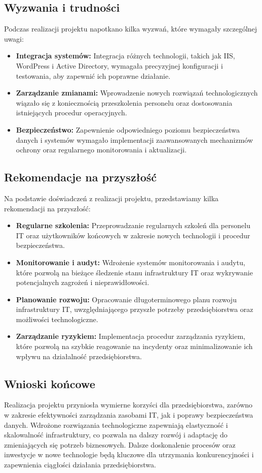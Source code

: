 \subsection{Wyzwania i trudności}
Podczas realizacji projektu napotkano kilka wyzwań, które wymagały szczególnej uwagi:
\begin{itemize}
    \item \textbf{Integracja systemów:} Integracja różnych technologii, takich jak IIS, WordPress i Active Directory, wymagała precyzyjnej konfiguracji i testowania, aby zapewnić ich poprawne działanie.
    \item \textbf{Zarządzanie zmianami:} Wprowadzenie nowych rozwiązań technologicznych wiązało się z koniecznością przeszkolenia personelu oraz dostosowania istniejących procedur operacyjnych.
    \item \textbf{Bezpieczeństwo:} Zapewnienie odpowiedniego poziomu bezpieczeństwa danych i systemów wymagało implementacji zaawansowanych mechanizmów ochrony oraz regularnego monitorowania i aktualizacji.
\end{itemize}

\subsection{Rekomendacje na przyszłość}
Na podstawie doświadczeń z realizacji projektu, przedstawiamy kilka rekomendacji na przyszłość:
\begin{itemize}
    \item \textbf{Regularne szkolenia:} Przeprowadzanie regularnych szkoleń dla personelu IT oraz użytkowników końcowych w zakresie nowych technologii i procedur bezpieczeństwa.
    \item \textbf{Monitorowanie i audyt:} Wdrożenie systemów monitorowania i audytu, które pozwolą na bieżące śledzenie stanu infrastruktury IT oraz wykrywanie potencjalnych zagrożeń i nieprawidłowości.
    \item \textbf{Planowanie rozwoju:} Opracowanie długoterminowego planu rozwoju infrastruktury IT, uwzględniającego przyszłe potrzeby przedsiębiorstwa oraz możliwości technologiczne.
    \item \textbf{Zarządzanie ryzykiem:} Implementacja procedur zarządzania ryzykiem, które pozwolą na szybkie reagowanie na incydenty oraz minimalizowanie ich wpływu na działalność przedsiębiorstwa.
\end{itemize}

\subsection{Wnioski końcowe}
Realizacja projektu przyniosła wymierne korzyści dla przedsiębiorstwa, zarówno w zakresie efektywności zarządzania zasobami IT, jak i poprawy bezpieczeństwa danych. Wdrożone rozwiązania technologiczne zapewniają elastyczność i skalowalność infrastruktury, co pozwala na dalszy rozwój i adaptację do zmieniających się potrzeb biznesowych. Dalsze doskonalenie procesów oraz inwestycje w nowe technologie będą kluczowe dla utrzymania konkurencyjności i zapewnienia ciągłości działania przedsiębiorstwa.


